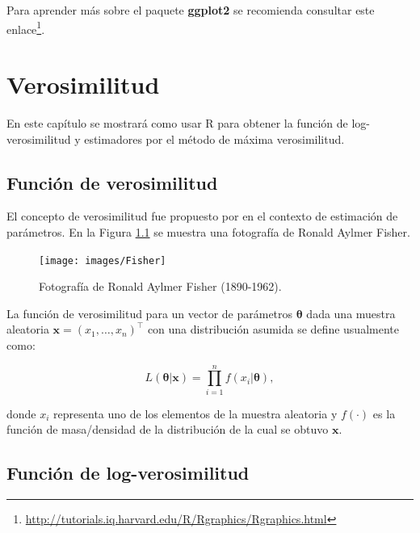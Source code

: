 \documentclass[
]{book}
\renewcommand{\href}[2]{#2\footnote{\url{#1}}}
\begin{document}
Para aprender más sobre el paquete \textbf{ggplot2} se recomienda consultar este \href{http://tutorials.iq.harvard.edu/R/Rgraphics/Rgraphics.html}{enlace}.

\hypertarget{loglik}{%
\chapter{Verosimilitud}\label{loglik}}

En este capítulo se mostrará como usar R para obtener la función de log-verosimilitud y estimadores por el método de máxima verosimilitud.

\hypertarget{funciuxf3n-de-verosimilitud}{%
\section{Función de verosimilitud}\label{funciuxf3n-de-verosimilitud}}

El concepto de verosimilitud fue propuesto por \citet{Fisher22} en el contexto de estimación de parámetros. En la Figura \ref{fig:fisher} se muestra una fotografía de Ronald Aylmer Fisher.

\begin{figure}

{\centering \texttt{[image: images/Fisher]} 

}

\caption{Fotografía de Ronald Aylmer Fisher (1890-1962).}\label{fig:fisher}
\end{figure}

La función de verosimilitud para un vector de parámetros \(\boldsymbol{\theta}\) dada una muestra aleatoria \(\boldsymbol{x}=(x_1, \ldots,x_n)^\top\) con una distribución asumida se define usualmente como:

\begin{equation}
L(\boldsymbol{\theta} | \boldsymbol{x}) = \prod_{i=1}^{n}  f(x_i | \boldsymbol{\theta}),
\label{eq:lik}
\end{equation}

donde \(x_i\) representa uno de los elementos de la muestra aleatoria y \(f(\cdot)\) es la función de masa/densidad de la distribución de la cual se obtuvo \(\boldsymbol{x}\).

\hypertarget{funciuxf3n-de-log-verosimilitud}{%
\section{Función de log-verosimilitud}\label{funciuxf3n-de-log-verosimilitud}}
\end{document}
